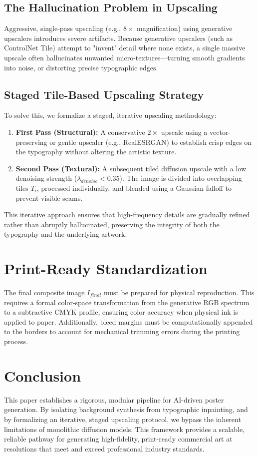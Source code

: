 \documentclass[10pt,journal,compsoc]{IEEEtran}
\begin{document}
\subsection{The Hallucination Problem in Upscaling}
Aggressive, single-pass upscaling (e.g., $8\times$ magnification) using generative upscalers introduces severe artifacts. Because generative upscalers (such as ControlNet Tile) attempt to "invent" detail where none exists, a single massive upscale often hallucinates unwanted micro-textures—turning smooth gradients into noise, or distorting precise typographic edges.

\subsection{Staged Tile-Based Upscaling Strategy}
To solve this, we formalize a staged, iterative upscaling methodology:
\begin{enumerate}
    \item \textbf{First Pass (Structural):} A conservative $2\times$ upscale using a vector-preserving or gentle upscaler (e.g., RealESRGAN) to establish crisp edges on the typography without altering the artistic texture.
    \item \textbf{Second Pass (Textural):} A subsequent tiled diffusion upscale with a low denoising strength ($\lambda_{denoise} < 0.35$). The image is divided into overlapping tiles $T_i$, processed individually, and blended using a Gaussian falloff to prevent visible seams.
\end{enumerate}
This iterative approach ensures that high-frequency details are gradually refined rather than abruptly hallucinated, preserving the integrity of both the typography and the underlying artwork.

\section{Print-Ready Standardization}
The final composite image $I_{final}$ must be prepared for physical reproduction. This requires a formal color-space transformation from the generative RGB spectrum to a subtractive CMYK profile, ensuring color accuracy when physical ink is applied to paper. Additionally, bleed margins must be computationally appended to the borders to account for mechanical trimming errors during the printing process.

\section{Conclusion}
This paper establishes a rigorous, modular pipeline for AI-driven poster generation. By isolating background synthesis from typographic inpainting, and by formalizing an iterative, staged upscaling protocol, we bypass the inherent limitations of monolithic diffusion models. This framework provides a scalable, reliable pathway for generating high-fidelity, print-ready commercial art at resolutions that meet and exceed professional industry standards.
\end{document}
